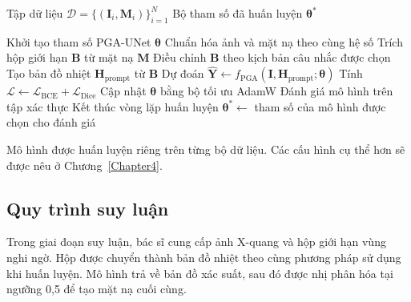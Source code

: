 \begin{algorithm}[H]
\caption{Quy trình huấn luyện PGA-UNet}
\label{alg:offline}
\begin{algorithmic}[1]
\Require Tập dữ liệu
$\mathcal{D}
=
\{(\mathbf{I}_i,\mathbf{M}_i)\}_{i=1}^{N}$
\Ensure Bộ tham số đã huấn luyện $\boldsymbol{\theta}^{*}$

\State Khởi tạo tham số PGA-UNet $\boldsymbol{\theta}$
        \State Chuẩn hóa ảnh và mặt nạ theo cùng hệ số
        \State Trích hộp giới hạn $\mathbf{B}$ từ mặt nạ $\mathbf{M}$
        \State Điều chỉnh $\mathbf{B}$ theo kịch bản câu nhắc được chọn
        \State Tạo bản đồ nhiệt
        $\mathbf{H}_{\mathrm{prompt}}$
        từ $\mathbf{B}$
        \State Dự đoán
        $\widehat{\mathbf{Y}}
        \leftarrow
        f_{\mathrm{PGA}}
        (\mathbf{I},\mathbf{H}_{\mathrm{prompt}};\boldsymbol{\theta})$
        \State Tính
        $\mathcal{L}
        \leftarrow
        \mathcal{L}_{\mathrm{BCE}}
        +
        \mathcal{L}_{\mathrm{Dice}}$
        \State Cập nhật $\boldsymbol{\theta}$ bằng bộ tối ưu AdamW
    \EndFor
    \State Đánh giá mô hình trên tập xác thực
        \State Kết thúc vòng lặp huấn luyện
    \EndIf
\EndWhile
\State \Return
$\boldsymbol{\theta}^{*}
\leftarrow$
tham số của mô hình được chọn cho đánh giá
\end{algorithmic}
\end{algorithm}

Mô hình được huấn luyện riêng trên từng bộ dữ liệu. Các cấu hình cụ thể hơn sẽ được nêu ở Chương~\ref{Chapter4}.

\subsection{Quy trình suy luận}

Trong giai đoạn suy luận, bác sĩ cung cấp ảnh X-quang và hộp giới hạn vùng nghi ngờ. Hộp được chuyển thành bản đồ nhiệt theo cùng phương pháp sử dụng khi huấn luyện. Mô hình trả về bản đồ xác suất, sau đó được nhị phân hóa tại ngưỡng 0,5 để tạo mặt nạ cuối cùng.

